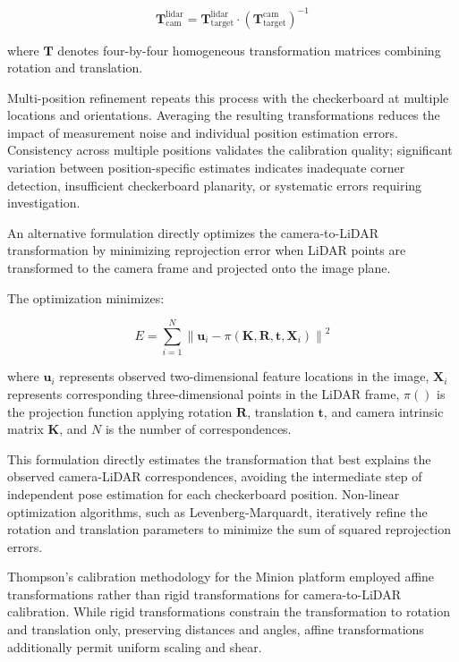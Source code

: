 \begin{equation}
    \mathbf{T}_{\text{cam}}^{\text{lidar}} = \mathbf{T}_{\text{target}}^{\text{lidar}} \cdot \left(\mathbf{T}_{\text{target}}^{\text{cam}}\right)^{-1}    
\end{equation}

where $\mathbf{T}$ denotes four-by-four homogeneous transformation matrices combining rotation and translation.

Multi-position refinement repeats this process with the checkerboard at multiple locations and orientations.
Averaging the resulting transformations reduces the impact of measurement noise and individual position estimation errors.
Consistency across multiple positions validates the calibration quality; significant variation between position-specific estimates indicates inadequate corner detection, insufficient checkerboard planarity, or systematic errors requiring investigation.


An alternative formulation directly optimizes the camera-to-LiDAR transformation by minimizing reprojection error when LiDAR points are transformed to the camera frame and projected onto the image plane.

The optimization minimizes:

\begin{equation}
    E = \sum_{i=1}^{N} \left\| \mathbf{u}_i - \pi(\mathbf{K}, \mathbf{R}, \mathbf{t}, \mathbf{X}_i) \right\|^2
\end{equation}


where $\mathbf{u}_i$ represents observed two-dimensional feature locations in the image, $\mathbf{X}_i$ represents corresponding three-dimensional points in the LiDAR frame, $\pi()$ is the projection function applying rotation $\mathbf{R}$, translation $\mathbf{t}$, and camera intrinsic matrix $\mathbf{K}$, and $N$ is the number of correspondences.

This formulation directly estimates the transformation that best explains the observed camera-LiDAR correspondences, avoiding the intermediate step of independent pose estimation for each checkerboard position.
Non-linear optimization algorithms, such as Levenberg-Marquardt, iteratively refine the rotation and translation parameters to minimize the sum of squared reprojection errors.


Thompson's calibration methodology for the Minion platform employed affine transformations rather than rigid transformations for camera-to-LiDAR calibration.
While rigid transformations constrain the transformation to rotation and translation only, preserving distances and angles, affine transformations additionally permit uniform scaling and shear.

